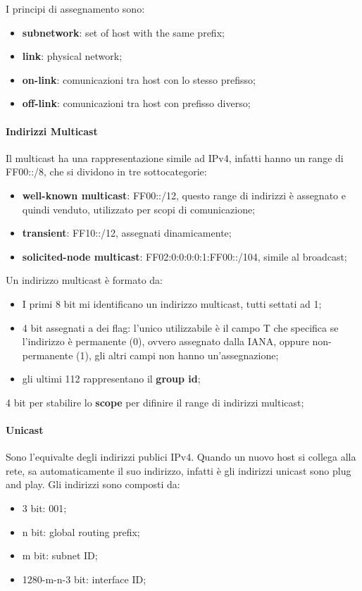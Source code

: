 \documentclass[12pt]{article}
\begin{document}
I principi di assegnamento sono:
\begin{itemize}
    \item \textbf{subnetwork}: set of host with the same prefix;
    \item \textbf{link}: physical network;
    \item \textbf{on-link}: comunicazioni tra host con lo stesso prefisso;
    \item \textbf{off-link}: comunicazioni tra host con prefisso diverso;
\end{itemize}

\paragraph{Indirizzi Multicast}
Il multicast ha una rappresentazione simile ad IPv4, infatti hanno un range di FF00::/8, che si dividono in tre sottocategorie:
\begin{itemize}
    \item \textbf{well-known multicast}: FF00::/12, questo range di indirizzi \`e assegnato e quindi venduto, utilizzato per scopi di comunicazione;
    \item \textbf{transient}: FF10::/12, assegnati dinamicamente;
    \item \textbf{solicited-node multicast}: FF02:0:0:0:0:1:FF00::/104, simile al broadcast;
\end{itemize}
Un indirizzo multicast \`e formato da:
\begin{itemize}
    \item I primi 8 bit mi identificano un indirizzo multicast, tutti settati ad 1;
    \item 4 bit assegnati a dei flag: l'unico utilizzabile \`e il campo T che specifica se l'indirizzo \`e permanente (0), ovvero assegnato dalla IANA, oppure non-permanente (1), gli altri campi non hanno un'assegnazione;
    \item gli ultimi 112 rappresentano il \textbf{group id};    
\end{itemize}


4 bit per stabilire lo \textbf{scope} per difinire il range di indirizzi multicast;

\paragraph{Unicast}
Sono l'equivalte degli indirizzi publici IPv4. Quando un nuovo host si collega alla rete, sa automaticamente il suo indirizzo, infatti \`e gli indirizzi unicast sono plug and play. Gli indirizzi sono composti da:
\begin{itemize}
    \item 3 bit: 001;
    \item n bit: global routing prefix;
    \item m bit: subnet ID;
    \item 1280-m-n-3 bit: interface ID;
\end{itemize}
\end{document}
